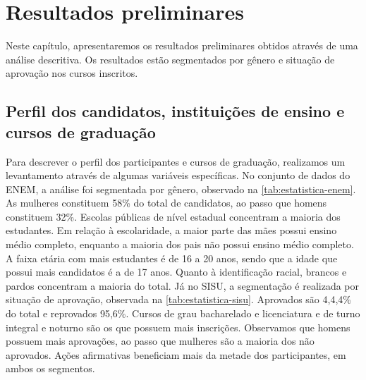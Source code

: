 \chapter{Resultados preliminares}
\label{chap:resultados-preliminares}
Neste capítulo, apresentaremos os resultados preliminares obtidos através de uma análise descritiva. Os resultados estão segmentados por gênero e situação de aprovação nos cursos inscritos.

\section{Perfil dos candidatos, instituições de ensino e cursos de graduação}
Para descrever o perfil dos participantes e cursos de graduação, realizamos um levantamento através de algumas variáveis específicas. No conjunto de dados do ENEM, a análise foi segmentada por gênero, observado na \autoref{tab:estatistica-enem}. As mulheres constituem 58\% do total de candidatos, ao passo que homens constituem 32\%. Escolas públicas de nível estadual concentram a maioria dos estudantes. Em relação à escolaridade, a maior parte das mães possui ensino médio completo, enquanto a maioria dos pais não possui ensino médio completo. A faixa etária com mais estudantes é de 16 a 20 anos, sendo que a idade que possui mais candidatos é a de 17 anos. Quanto à identificação racial, brancos e pardos concentram a maioria do total. Já no SISU, a segmentação é realizada por situação de aprovação, observada na \autoref{tab:estatistica-sisu}. Aprovados são 4,4,4\% do total e reprovados 95,6\%. Cursos de grau bacharelado e licenciatura e de turno integral e noturno são os que possuem mais inscrições. Observamos que homens possuem mais aprovações, ao passo que mulheres são a maioria dos não aprovados. Ações afirmativas beneficiam mais da metade dos participantes, em ambos os segmentos.

